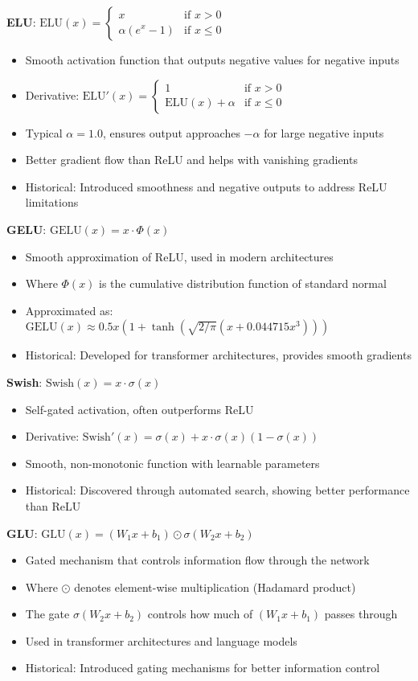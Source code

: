 \textbf{ELU}: $\text{ELU}(x) = \begin{cases} x & \text{if } x > 0 \\ \alpha(e^x - 1) & \text{if } x \leq 0 \end{cases}$
\begin{itemize}
	\item Smooth activation function that outputs negative values for negative inputs
	\item Derivative: $\text{ELU}'(x) = \begin{cases} 1 & \text{if } x > 0 \\ \text{ELU}(x) + \alpha & \text{if } x \leq 0 \end{cases}$
	\item Typical $\alpha = 1.0$, ensures output approaches $-\alpha$ for large negative inputs
	\item Better gradient flow than ReLU and helps with vanishing gradients
	\item Historical: Introduced smoothness and negative outputs to address ReLU limitations
\end{itemize}

\textbf{GELU}: $\text{GELU}(x) = x \cdot \Phi(x)$
\begin{itemize}
	\item Smooth approximation of ReLU, used in modern architectures
	\item Where $\Phi(x)$ is the cumulative distribution function of standard normal
	\item Approximated as: $\text{GELU}(x) \approx 0.5x(1 + \tanh(\sqrt{2/\pi}(x + 0.044715x^3)))$
	\item Historical: Developed for transformer architectures, provides smooth gradients
\end{itemize}

\textbf{Swish}: $\text{Swish}(x) = x \cdot \sigma(x)$
\begin{itemize}
	\item Self-gated activation, often outperforms ReLU
	\item Derivative: $\text{Swish}'(x) = \sigma(x) + x \cdot \sigma(x)(1 - \sigma(x))$
	\item Smooth, non-monotonic function with learnable parameters
	\item Historical: Discovered through automated search, showing better performance than ReLU
\end{itemize}

\textbf{GLU}: $\text{GLU}(x) = (W_1x + b_1) \odot \sigma(W_2x + b_2)$
\begin{itemize}
	\item Gated mechanism that controls information flow through the network
	\item Where $\odot$ denotes element-wise multiplication (Hadamard product)
	\item The gate $\sigma(W_2x + b_2)$ controls how much of $(W_1x + b_1)$ passes through
	\item Used in transformer architectures and language models
	\item Historical: Introduced gating mechanisms for better information control
\end{itemize}


